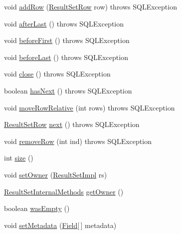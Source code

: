 \begin{DoxyCompactItemize}
void \mbox{\hyperlink{classcom_1_1mysql_1_1jdbc_1_1_row_data_cursor_aa384c610f8b2ad9b5638214fa92c7dd6}{add\+Row}} (\mbox{\hyperlink{classcom_1_1mysql_1_1jdbc_1_1_result_set_row}{Result\+Set\+Row}} row)  throws S\+Q\+L\+Exception 
\item 
void \mbox{\hyperlink{classcom_1_1mysql_1_1jdbc_1_1_row_data_cursor_a047166ec355bf9ee581c9e1a794bda69}{after\+Last}} ()  throws S\+Q\+L\+Exception 
\item 
void \mbox{\hyperlink{classcom_1_1mysql_1_1jdbc_1_1_row_data_cursor_abdc75072380b9002e7011451143527c4}{before\+First}} ()  throws S\+Q\+L\+Exception 
\item 
void \mbox{\hyperlink{classcom_1_1mysql_1_1jdbc_1_1_row_data_cursor_ad4fae6a3882e5973545d91ff6069e92b}{before\+Last}} ()  throws S\+Q\+L\+Exception 
\item 
void \mbox{\hyperlink{classcom_1_1mysql_1_1jdbc_1_1_row_data_cursor_a8ffbd795d22ff847acae23bb8c51ea08}{close}} ()  throws S\+Q\+L\+Exception 
\item 
boolean \mbox{\hyperlink{classcom_1_1mysql_1_1jdbc_1_1_row_data_cursor_a1d8d73e103d1c80332773c360103314f}{has\+Next}} ()  throws S\+Q\+L\+Exception 
\item 
void \mbox{\hyperlink{classcom_1_1mysql_1_1jdbc_1_1_row_data_cursor_a48c5fb5e19b57e073818cc524d913155}{move\+Row\+Relative}} (int rows)  throws S\+Q\+L\+Exception 
\item 
\mbox{\hyperlink{classcom_1_1mysql_1_1jdbc_1_1_result_set_row}{Result\+Set\+Row}} \mbox{\hyperlink{classcom_1_1mysql_1_1jdbc_1_1_row_data_cursor_a10e57b268e86eaa793ecf951ee83a863}{next}} ()  throws S\+Q\+L\+Exception 
\item 
void \mbox{\hyperlink{classcom_1_1mysql_1_1jdbc_1_1_row_data_cursor_a8283d0e9ac8563a11f64e5d04b0b5f59}{remove\+Row}} (int ind)  throws S\+Q\+L\+Exception 
\item 
int \mbox{\hyperlink{classcom_1_1mysql_1_1jdbc_1_1_row_data_cursor_ad597fd5a0264701684a13303c49b13b6}{size}} ()
\item 
void \mbox{\hyperlink{classcom_1_1mysql_1_1jdbc_1_1_row_data_cursor_a25748b23c56c3eb739f1777f44bb7753}{set\+Owner}} (\mbox{\hyperlink{classcom_1_1mysql_1_1jdbc_1_1_result_set_impl}{Result\+Set\+Impl}} rs)
\item 
\mbox{\hyperlink{interfacecom_1_1mysql_1_1jdbc_1_1_result_set_internal_methods}{Result\+Set\+Internal\+Methods}} \mbox{\hyperlink{classcom_1_1mysql_1_1jdbc_1_1_row_data_cursor_a82d9aac57045528a72f5d979fe7490bd}{get\+Owner}} ()
\item 
boolean \mbox{\hyperlink{classcom_1_1mysql_1_1jdbc_1_1_row_data_cursor_a1a7ddb6250de847e90a2146a01ab0f46}{was\+Empty}} ()
\item 
void \mbox{\hyperlink{classcom_1_1mysql_1_1jdbc_1_1_row_data_cursor_a1547b71ee8de048e0299a8ec7a8b3ead}{set\+Metadata}} (\mbox{\hyperlink{classcom_1_1mysql_1_1jdbc_1_1_field}{Field}}\mbox{[}$\,$\mbox{]} metadata)
\end{DoxyCompactItemize}
